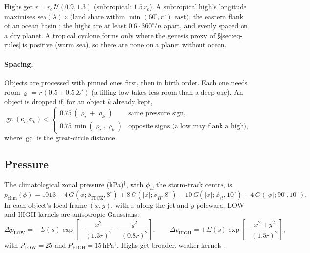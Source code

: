 \documentclass[11pt,a4paper]{article}
\begin{document}
Highs get $r=r_c\,\mathcal{U}(0.9,1.3)$ (subtropical: $1.5\,r_c$). A subtropical high's
longitude maximises $\mathrm{sea}(\lambda)\times\text{(land share within }\min(60^\circ,r^\circ)
\text{ east)}$, the eastern flank of an ocean basin \cite{klein1993}; the highs are at least
$0.6\cdot360^\circ/n$ apart, and evenly spaced on a dry planet. A tropical cyclone forms
only where the genesis proxy of \S\ref{sec:eq-rules} is positive (warm sea), so there are
none on a planet without ocean.

\paragraph{Spacing.}
Objects are processed with pinned ones first, then in birth order. Each one needs room
$\varrho=r\,(0.5+0.5\,\Sigma')$ (a filling low takes less room than a deep one). An object is
dropped if, for an object $k$ already kept,
\begin{equation}
  \operatorname{gc}(\mathbf{c}_i,\mathbf{c}_k)<
  \begin{cases}
    0.75\,(\varrho_i+\varrho_k) & \text{same pressure sign},\\
    0.75\,\min(\varrho_i,\varrho_k) & \text{opposite signs (a low may flank a high)},
  \end{cases}
\end{equation}
where $\operatorname{gc}$ is the great-circle distance.

\subsection{Pressure}
\label{sec:eq-pressure}
The climatological zonal pressure (hPa)$^\dagger$, with $\phi_{st}$ the storm-track centre, is
\begin{equation}
  p_{\mathrm{clim}}(\phi)=1013-4\,G(\phi;\phi_{\mathrm{ITCZ}},8^\circ)
  +8\,G(|\phi|;\phi_H,8^\circ)-10\,G(|\phi|;\phi_{st},10^\circ)+4\,G(|\phi|;90^\circ,10^\circ).
\end{equation}
In each object's local frame $(x,y)$, with $x$ along the jet and $y$ poleward, LOW and HIGH
kernels are anisotropic Gaussians:
\begin{equation}
  \Delta p_{\mathrm{LOW}}=-\Sigma(s)\exp\!\left[-\frac{x^2}{(1.3r)^2}-\frac{y^2}{(0.8r)^2}\right],\qquad
  \Delta p_{\mathrm{HIGH}}=+\Sigma(s)\exp\!\left[-\frac{x^2+y^2}{(1.5r)^2}\right],
\end{equation}
with $P_{\mathrm{LOW}}=25$ and $P_{\mathrm{HIGH}}=15$\,hPa$^\dagger$. Highs get broader,
weaker kernels \cite{hoskins2002}.
\end{document}
